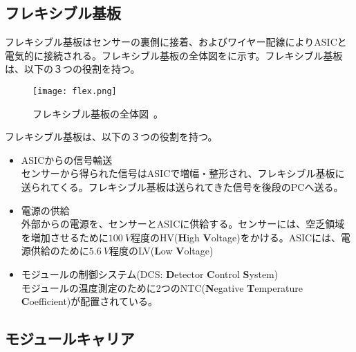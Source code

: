

\subsection{フレキシブル基板}
\label{sec:flex}

フレキシブル基板はセンサーの裏側に接着、およびワイヤー配線によりASICと電気的に接続される。フレキシブル基板の全体図をに示す。フレキシブル基板は、以下の３つの役割を持つ。

\begin{figure}[tbp]
  \centering
  \texttt{[image: flex.png]}
  \caption[フレキシブル基板]{フレキシブル基板の全体図\ \cite{itk}。}
  \label{fig:flex}
\end{figure}

フレキシブル基板は、以下の３つの役割を持つ。
\begin{itemize}
  \item ASICからの信号輸送  \\
  センサーから得られた信号はASICで増幅・整形され、フレキシブル基板に送られてくる。フレキシブル基板は送られてきた信号を後段のPCへ送る。
  \item 電源の供給 \\
  外部からの電源を、センサーとASICに供給する。センサーには、空乏領域を増加させるために$100\ \si{V}$程度のHV(\textbf{H}igh \textbf{V}oltage)をかける。ASICには、電源供給のために$5.6\ \si{V}$程度のLV(\textbf{L}ow \textbf{V}oltage)
  \item モジュールの制御システム(DCS: \textbf{D}etector \textbf{C}ontrol \textbf{S}ystem) \\
  モジュールの温度測定のために2つのNTC(\textbf{N}egative \textbf{T}emperature \textbf{C}oefficient)が配置されている。
\end{itemize}

\subsection{モジュールキャリア}
\label{sec:carrier}

